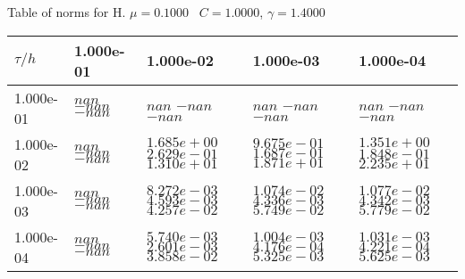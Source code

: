 \begin{center}
Table of norms for H. $\mu = 0.1000$ \, $C = 1.0000$, $\gamma = 1.4000$
  
\begin{tabular}{|p{1in}|p{1in}|p{1in}|p{1in}|p{1in}|} \hline
$\tau / h$ &1.000e-01 &1.000e-02 &1.000e-03 &1.000e-04 \\ \hline 
1.000e-01 & $nan$  $-nan$  $-nan$  & $nan$  $-nan$  $-nan$  & $nan$  $-nan$  $-nan$  & $nan$  $-nan$  $-nan$  \\ \hline 
1.000e-02 & $nan$  $-nan$  $-nan$  & $1.685e+00$  $2.629e-01$  $1.310e+01$  & $9.675e-01$  $1.687e-01$  $1.871e+01$  & $1.351e+00$  $1.848e-01$  $2.235e+01$  \\ \hline 
1.000e-03 & $nan$  $-nan$  $-nan$  & $8.272e-03$  $4.593e-03$  $4.257e-02$  & $1.074e-02$  $4.336e-03$  $5.749e-02$  & $1.077e-02$  $4.342e-03$  $5.779e-02$  \\ \hline 
1.000e-04 & $nan$  $-nan$  $-nan$  & $5.740e-03$  $2.601e-03$  $3.858e-02$  & $1.004e-03$  $4.176e-04$  $5.325e-03$  & $1.031e-03$  $4.221e-04$  $5.625e-03$  \\ \hline 

\end{tabular}\\[20pt]
\end{center}
